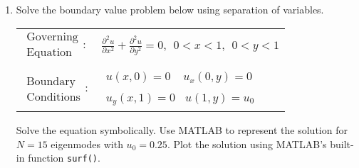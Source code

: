 \begin{fullwidth}
\begin{enumerate}
\item Solve the boundary value problem below using separation of variables.
\begin{table}[h]
\begin{tabular}{l l}
$\substack{\text{Governing} \\\text{Equation}}: $& $\frac{\partial^2 u}{\partial x^2} + \frac{\partial^2 u}{\partial y^2} = 0, \ \ 0<x<1, \ \ 0<y<1 $\\
& \\
$\substack{\text{Boundary} \\ \text{Conditions}}: $ & $\substack{u(x,0)=0  \ \ \  \ \ u_x(0,y) = 0 \\ \\ u_y(x,1) = 0 \ \ \ \ u(1,y) = u_0}$ 
\end{tabular}
\end{table} 

\vspace{0.25cm}

\noindent Solve the equation symbolically.  Use MATLAB to represent the solution for $N=15$ eigenmodes with $u_0=0.25$.  Plot the solution using MATLAB's built-in function \lstinline[style=myMatlab]{surf()}.

\end{enumerate}

\end{fullwidth}


